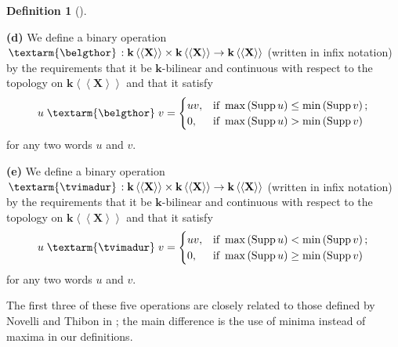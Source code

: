 \documentclass[numbers=enddot,12pt,final,onecolumn,notitlepage,abstracton]{scrartcl}%
\theoremstyle{definition}
\newtheorem{defi}[theo]{Definition}
\newenvironment{definition}[1][]
{\begin{defi}[#1]\begin{leftbar}}
{\end{leftbar}\end{defi}}
\newcommand{\tvi}{\left. \textarm{\tvimadur} \right.}
\newcommand{\bel}{\left. \textarm{\belgthor} \right.}
\begin{document}
\begin{definition}
\textbf{(d)} We define a binary operation $\bel :\mathbf{k}\left\langle
\left\langle \mathbf{X}\right\rangle \right\rangle \times\mathbf{k}%
\left\langle \left\langle \mathbf{X}\right\rangle \right\rangle \rightarrow
\mathbf{k}\left\langle \left\langle \mathbf{X}\right\rangle \right\rangle $
(written in infix notation) by the requirements that it be $\mathbf{k}%
$-bilinear and continuous with respect to the topology on $\mathbf{k}%
\left\langle \left\langle \mathbf{X}\right\rangle \right\rangle $ and that it
satisfy%
\[
u \bel v=
\begin{cases}
uv, & \text{if }\max\left(  \operatorname*{Supp}u\right)  \leq\min\left(
\operatorname*{Supp}v\right)  ;\\
0, & \text{if }\max\left(  \operatorname*{Supp}u\right)  >\min\left(
\operatorname*{Supp}v\right)
\end{cases}
\]
for any two words $u$ and $v$.

\textbf{(e)} We define a binary operation $\tvi :\mathbf{k}\left\langle
\left\langle \mathbf{X}\right\rangle \right\rangle \times\mathbf{k}%
\left\langle \left\langle \mathbf{X}\right\rangle \right\rangle \rightarrow
\mathbf{k}\left\langle \left\langle \mathbf{X}\right\rangle \right\rangle $
(written in infix notation) by the requirements that it be $\mathbf{k}%
$-bilinear and continuous with respect to the topology on $\mathbf{k}%
\left\langle \left\langle \mathbf{X}\right\rangle \right\rangle $ and that it
satisfy%
\[
u \tvi v=
\begin{cases}
uv, & \text{if }\max\left(  \operatorname*{Supp}u\right)  <\min\left(
\operatorname*{Supp}v\right)  ;\\
0, & \text{if }\max\left(  \operatorname*{Supp}u\right)  \geq\min\left(
\operatorname*{Supp}v\right)
\end{cases}
\]
for any two words $u$ and $v$.
\end{definition}

The first three of these five operations are closely related to those defined
by Novelli and Thibon in \cite{NoThi05}; the main difference is the use of
minima instead of maxima in our definitions.
\end{document}
